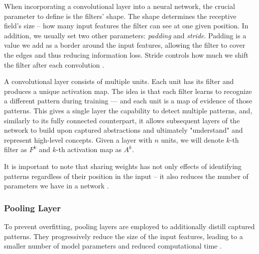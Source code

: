 When incorporating a convolutional layer into a neural network, the crucial parameter to define is the filters' shape.
The shape determines the receptive field's size -- how many input features the filter can see at one given position.
In addition, we usually set two other parameters: \emph{padding} and \emph{stride}.
Padding is a value we add as a border around the input features, allowing the filter to cover the edges and thus reducing information loss.
Stride controls how much we shift the filter after each convolution \cite{cnns}.


A convolutional layer consists of multiple units.
Each unit has its filter and produces a unique activation map.
The idea is that each filter learns to recognize a different pattern during training --- and each unit is a map of evidence of those patterns.
This gives a single layer the capability to detect multiple patterns, and, similarly to its fully connected counterpart, it allows subsequent layers of the network to build upon captured abstractions and ultimately "understand" and represent high-level concepts.
Given a layer with $n$ units, we will denote $k$-th filter as $F^k$ and $k$-th activation map as $A^k$.

It is important to note that sharing weights has not only effects of identifying patterns regardless of their position in the input -- it also reduces the number of parameters we have in a network \cite{cnns}.

\subsubsection{Pooling Layer}

To prevent overfitting, pooling layers are employed to additionally distill captured patterns.
They progressively reduce the size of the input features, leading to a smaller number of model parameters and reduced computational time \cite{cnns}.

